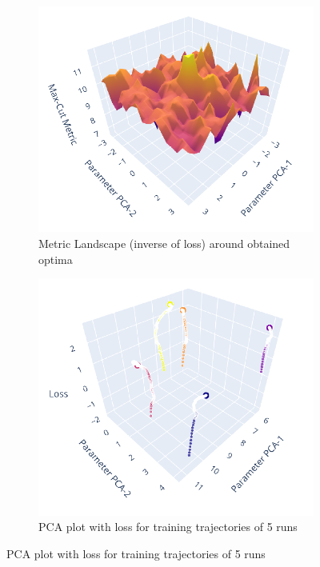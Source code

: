 \documentclass[%
 reprint,
 amsmath,
 amssymb,
 showkeys,
 pra,
 floatfix,
 onecolumn,
]{revtex4-2}
\begin{document}
\begin{figure}[htp]
    \centering
    \begin{subfigure}[b]{0.32\linewidth}
        \includegraphics[width=\textwidth]{images/supplementary-qleet-1.pdf}
        \caption{Metric Landscape (inverse of loss) around obtained optima}
    \end{subfigure}
    \begin{subfigure}[b]{0.32\linewidth}
        \includegraphics[width=\textwidth]{images/supplementary-qleet-2.pdf}
        \caption{PCA plot with loss for training trajectories of 5 runs}

\end{subfigure}
\end{figure}
\end{document}
